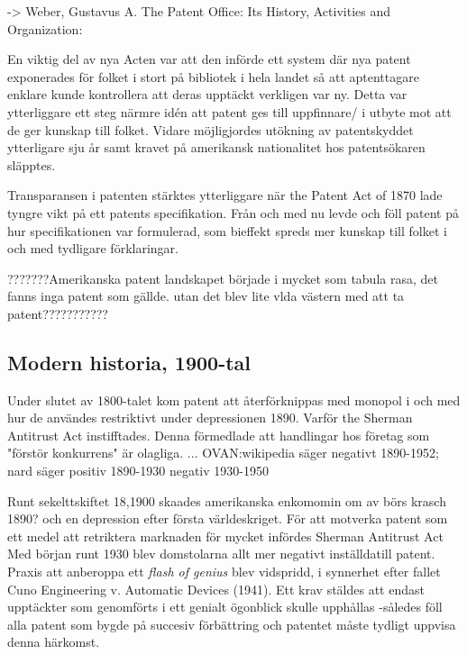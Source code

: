 -> Weber, Gustavus A. The Patent Office: Its History, Activities and Organization:

En viktig del av nya Acten var att den införde ett system där nya patent exponerades för folket i stort på
bibliotek i hela landet så att aptenttagare enklare kunde kontrollera att deras upptäckt verkligen var ny\cite{watson}.
Detta var ytterliggare ett steg närmre idén att patent ges till uppfinnare/ i utbyte mot att de ger kunskap till folket.
Vidare möjligjordes utökning av patentskyddet ytterligare sju år \cite{watson} samt kravet på amerikansk nationalitet hos
patentsökaren släpptes.

Transparansen i patenten stärktes ytterliggare när the Patent Act of 1870 lade tyngre vikt på ett patents
specifikation. Från och med nu levde och föll patent på hur specifikationen var formulerad, som bieffekt
spreds mer kunskap till folket i och med tydligare förklaringar\cite{nard}.

???????Amerikanska patent landskapet började i mycket som tabula rasa, det fanns inga patent som gällde.
utan det blev lite vlda västern med att ta patent???????????


\subsection{Modern historia, 1900-tal} %

Under slutet av 1800-talet kom patent att återförknippas med monopol i och med hur de användes restriktivt
under depressionen 1890. Varför the Sherman Antitrust Act instifftades. Denna förmedlade att handlingar hos
företag som "förstör konkurrens" är olagliga. ... OVAN:wikipedia säger negativt 1890-1952; nard säger
positiv 1890-1930 negativ 1930-1950

Runt sekelttskiftet 18,1900 skaades amerikanska enkomomin om av börs krasch 1890? och en depression efter första världeskriget. För att motverka patent som ett medel att retriktera marknaden för mycket infördes Sherman Antitrust Act
Med början runt 1930 blev domstolarna allt mer negativt inställdatill patent. Praxis att anberoppa ett \emph{flash of genius} blev vidspridd, i synnerhet efter fallet Cuno
Engineering v. Automatic Devices (1941). Ett krav stäldes att endast upptäckter som genomförts i ett
genialt ögonblick skulle upphållas -således föll alla patent som bygde på succesiv förbättring och patentet
måste tydligt uppvisa denna härkomst\cite{nard}.

